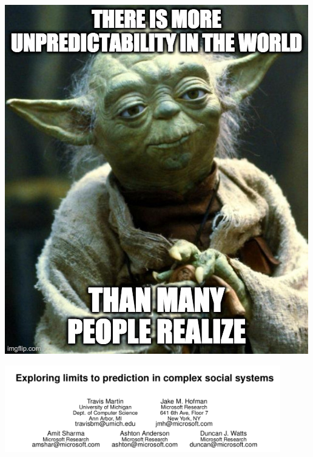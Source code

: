 \documentclass[aspectratio=169]{beamer}
\begin{document}
\begin{frame}

\begin{center}
\includegraphics[height=0.9\textheight]{figures/there_is_more}
\end{center}

\end{frame}
\begin{frame}

\begin{center}
\includegraphics[width=0.9\textwidth]{figures/martin_exploring_2016_title}
\end{center}

\end{frame}
\end{document}
